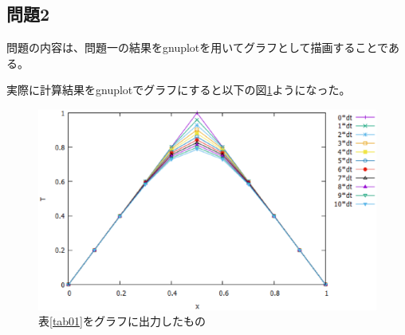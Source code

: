 \documentclass{jsarticle}
\begin{document}
\subsection{問題2}
問題の内容は、問題一の結果をgnuplotを用いてグラフとして描画することである。

実際に計算結果をgnuplotでグラフにすると以下の図\ref{fig03}ようになった。
\begin{figure}[H]
	\centering
	\includegraphics[width=14cm]{pic03.eps}
	\caption{表\ref{tab01}をグラフに出力したもの}
	\label{fig03}
\end{figure}
\end{document}
